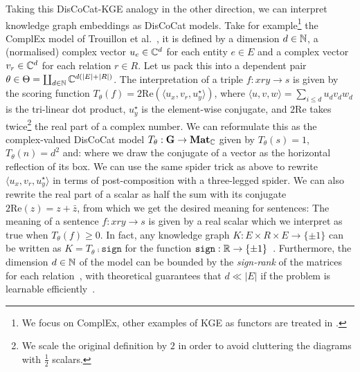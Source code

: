 Taking this DisCoCat-KGE analogy in the other direction, we can interpret knowledge graph embeddings as DisCoCat models.
Take for example\footnote
{We focus on ComplEx, other examples of KGE as functors are treated in \cite[Section~2.6]{Felice22}.}
the ComplEx model of Trouillon et al.~\cite{TrouillonEtAl16,TrouillonEtAl17}, it is defined by a dimension $d \in \mathbb{N}$, a (normalised) complex vector $u_e \in \mathbb{C}^d$ for each entity $e \in E$ and a complex vector $v_r \in \mathbb{C}^d$ for each relation $r \in R$.
Let us pack this into a dependent pair $\theta \in \Theta = \coprod_{d \in \mathbb{N}} \mathbb{C}^{d (\vert E \vert + \vert R \vert)}$.
The interpretation of a triple $f : x r y \to s$ is given by the scoring function $T_\theta(f) = 2 \text{Re}(\langle u_x, v_r, u_y^\star \rangle)$, where $\langle u, v, w \rangle = \sum_{i \leq d} u_d v_d w_d$ is the tri-linear dot product, $u_y^\star$ is the element-wise conjugate, and $2 \text{Re}$ takes twice\footnote
{We scale the original definition by $2$ in order to avoid cluttering the diagrams with $\frac{1}{2}$ scalars.} the real part of a complex number.
We can reformulate this as the complex-valued DisCoCat model $T_\theta : \mathbf{G} \to \mathbf{Mat}_{\mathbb{C}}$ given by $T_\theta(s) = 1$, $T_\theta(n) = d^2$ and:
where we draw the conjugate of a vector as the horizontal reflection of its box.
We can use the same spider trick as above to rewrite $\langle u_x, v_r, u_y^\star \rangle$ in terms of post-composition with a three-legged spider.
We can also rewrite the real part of a scalar as half the sum with its conjugate $2 \text{Re}(z) = z + \bar z$, from which we get the desired meaning for sentences:
The meaning of a sentence $f : x r y \to s$ is given by a real scalar which we interpret as true when $T_\theta(f) \geq 0$.
In fact, any knowledge graph $K : E \times R \times E \to \{ \pm 1 \}$ can be written as $K = T_\theta \fcmp \mathtt{sign}$ for the function $\mathtt{sign} : \mathbb{R} \to \{ \pm 1 \}$~\cite[Theorem~4]{TrouillonEtAl17}.
Furthermore, the dimension $d \in \mathbb{N}$ of the model can be bounded by the \emph{sign-rank} of the matrices for each relation~\cite[Proposition~2.5.17]{Felice22}, with theoretical guarantees that $d \ll \vert E \vert$ if the problem is learnable efficiently~\cite{AlonEtAl16a}.

